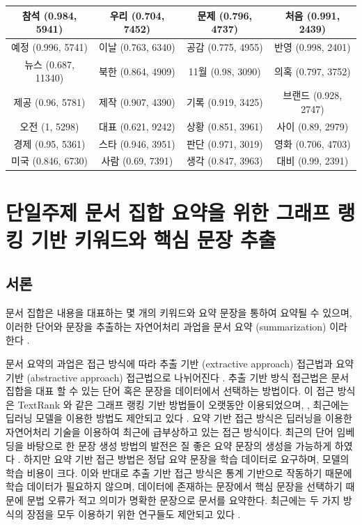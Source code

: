 \documentclass[oneside, ko,phd]{snuthesis_utf8_kor}
\begin{document}
\begin{table}[H]
{\begin{tabular}{|c|c|c|c|}
참석 (0.984, 5941) & 우리 (0.704, 7452) & 문제 (0.796, 4737) & 처음 (0.991, 2439) \\ \hline
예정 (0.996, 5741) & 이날 (0.763, 6340) & 공감 (0.775, 4955) & 반영 (0.998, 2401) \\ \hline
뉴스 (0.687, 11340) & 북한 (0.864, 4909) & 11월 (0.98, 3090) & 의혹 (0.797, 3752) \\ \hline
제공 (0.96, 5781) & 제작 (0.907, 4390) & 기록 (0.919, 3425) & 브랜드 (0.928, 2747) \\ \hline
오전 (1, 5298) & 대표 (0.621, 9242) & 상황 (0.851, 3961) & 사이 (0.89, 2979) \\ \hline
경제 (0.95, 5361) & 스타 (0.946, 3951) & 판단 (0.971, 3019) & 영화 (0.706, 4703) \\ \hline
미국 (0.846, 6730) & 사람 (0.69, 7391) & 생각 (0.847, 3963) & 대비 (0.99, 2391) \\ \hline
\end{tabular}%
}
\end{table}

\newpage
\chapter{단일주제 문서 집합 요약을 위한 그래프 랭킹 기반 키워드와 핵심 문장 추출} \label{summarize_single_topic}

\section{서론}

문서 집합은 내용을 대표하는 몇 개의 키워드와 요약 문장을 통하여 요약될 수 있으며, 이러한 단어와 문장을 추출하는 자연어처리 과업을 문서 요약 (summarization) 이라 한다 \cite{yao2017recent}.

문서 요약의 과업은 접근 방식에 따라 추출 기반 (extractive approach) 접근법과 요약 기반 (abstractive approach) 접근법으로 나뉘어진다 \cite{yao2017recent}.
추출 기반 방식 접근법은 문서 집합을 대표 할 수 있는 단어 혹은 문장을 데이터에서 선택하는 방법이다.
이 접근 방식은 TextRank \cite{mihalcea2004textrank} 와 같은 그래프 랭킹 기반 방법들이 오랫동안 이용되었으며,  \cite{parveen2015topical, narayan2018ranking}, 최근에는 딥러닝 모델을 이용한 방법도 제안되고 있다 \cite{rush2015neural}.
요약 기반 접근 방식은 딥러닝을 이용한 자연어처리 기술을 이용하여 최근에 급부상하고 있는 접근 방식이다.
최근의 단어 임베딩을 바탕으로 한 문장 생성 방법의 발전은 \cite{bengio2003neural, donahue2015long, xu2015show, nallapati2016abstractive} 질 좋은 요약 문장의 생성을 가능하게 하였다 \cite{nallapati2016abstractive}.
하지만 요약 기반 접근 방법은 정답 요약 문장을 학습 데이터로 요구하며, 모델의 학습 비용이 크다.
이와 반대로 추출 기반 접근 방식은 통계 기반으로 작동하기 때문에 학습 데이터가 필요하지 않으며, 데이터에 존재하는 문장에서 핵심 문장을 선택하기 때문에 문법 오류가 적고 의미가 명확한 문장으로 문서를 요약한다.
최근에는 두 가지 방식의 장점을 모두 이용하기 위한 연구들도 제안되고 있다 \cite{banerjee2015multi, bing2015abstractive, gu2016incorporating}.
\end{document}
